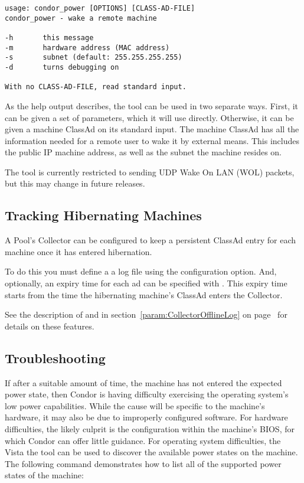 \begin{verbatim}
usage: condor_power [OPTIONS] [CLASS-AD-FILE]
condor_power - wake a remote machine

-h       this message
-m       hardware address (MAC address)
-s       subnet (default: 255.255.255.255)
-d       turns debugging on

With no CLASS-AD-FILE, read standard input.
\end{verbatim}

As the help output describes, the tool can be used in two separate ways. 
First, it can be given a set of parameters, which it will use directly. 
Otherwise, it can be given a machine ClassAd on its standard input.
The machine ClassAd has all the information needed for a remote user
to wake it by external means. This includes the public IP machine address,
as well as the subnet the machine resides on.

The tool is currently restricted to sending UDP Wake On LAN (WOL) packets, 
but this may change in future releases.

\subsection{Tracking Hibernating Machines}

A Pool's Collector can be configured to keep a persistent ClassAd
entry for each machine once it has entered hibernation.

To do this you must define a a log file using the 
configuration option.  And, optionally, an expiry time for each ad can
be specified with .  This expiry
time starts from the time the hibernating machine's ClassAd enters
the Collector.

See the description of  and
 in
section~\ref{param:CollectorOfflineLog} on
page~\pageref{param:CollectorOfflineLog} for details on
these features.

\subsection{Troubleshooting}

If after a suitable amount of time,
the machine has not entered the expected power state,
then Condor is having difficulty exercising the operating system's
low power capabilities.  
While the cause will be specific to the machine's hardware,
it may also be due to improperly configured software.  
For hardware difficulties,
the likely culprit is the configuration within the machine's BIOS,
for which Condor can offer little guidance.
For operating system difficulties,
the Vista the  tool can be used to discover the available 
power states on the machine.
The following command demonstrates how to
list all of the supported power states of the machine:

